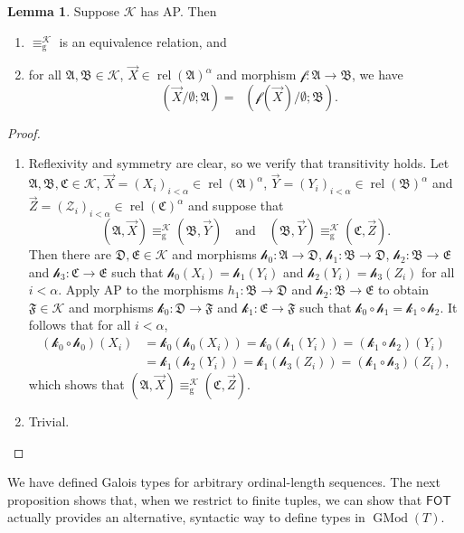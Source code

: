 \documentclass[a4paper]{amsart}
\theoremstyle{definition}
\newtheorem{lemma}[definition]{Lemma}
\theoremstyle{remark}
\newcommand{\Z}{\mathcal{Z}}
\newcommand{\A}{\mathcal{A}}
\newcommand{\B}{\mathcal{B}}
\newcommand{\C}{\mathcal{C}}
\newcommand{\D}{\mathcal{D}}
\newcommand{\E}{\mathcal{E}}
\newcommand{\F}{\mathcal{F}}
\newcommand\fot{\mathsf{FOT}}
\DeclareMathOperator{\rel}{rel}
\newcommand{\K}{\mathcal{K}}
\theoremstyle{definition}
\renewcommand{\A}{\mathfrak{A}}
\renewcommand{\B}{\mathfrak{B}}
\renewcommand{\C}{\mathfrak{C}}
\renewcommand{\D}{\mathfrak{D}}
\renewcommand{\E}{\mathfrak{E}}
\renewcommand{\F}{\mathfrak{F}}
\DeclareMathOperator{\gtype}{tp_g}
\newcommand{\f}{\mathcal{f}}
\newcommand{\h}{\mathcal{h}}
\renewcommand{\k}{\mathcal{k}}
\DeclareMathOperator{\GMod}{GMod}
\begin{document}
\begin{lemma}\label{property.gtypes}
    Suppose $\K$ has AP. Then
    \begin{enumerate}
        \item $\equiv_{\mathrm{g}}^\K$ is an equivalence relation, and
        \item for all $\A,\B\in\K$, $\vec X\in\rel(\A)^\alpha$ and morphism $\f\colon\A\to\B$, we have
        \[
            \gtype(\vec X / \emptyset; \A) = \gtype(\f(\vec X) / \emptyset; \B).
        \]
    \end{enumerate}
\end{lemma}
\begin{proof}\quad
    \begin{enumerate}
        \item Reflexivity and symmetry are clear, so we verify that transitivity holds. Let $\A,\B,\C\in\K$, $\vec X = (X_i)_{i<\alpha}\in\rel(\A)^\alpha$, $\vec Y = (Y_i)_{i<\alpha}\in\rel(\B)^\alpha$ and $\vec Z = (\Z_i)_{i<\alpha}\in\rel(\C)^\alpha$ and suppose that
        \[
            (\A,\vec X) \equiv_{\mathrm{g}}^\K (\B,\vec Y) \quad\text{and}\quad (\B,\vec Y) \equiv_{\mathrm{g}}^\K (\C,\vec Z).
        \]
        Then there are $\D,\E\in\K$ and morphisms $\h_0\colon\A\to\D$, $\h_1\colon\B\to\D$, $\h_2\colon\B\to\E$ and $\h_3\colon\C\to\E$ such that $\h_0(X_i)=\h_1(Y_i)$ and $\h_2(Y_i)=\h_3(Z_i)$ for all $i<\alpha$.  Apply AP to the morphisms $h_1\colon\B\to\D$ and $\h_2\colon\B\to\E$ to obtain $\F\in\K$ and morphisms $\k_0\colon\D\to\F$ and $\k_1\colon\E\to\F$ such that $\k_0\circ\h_1 = \k_1\circ\h_2$. It follows that for all $i<\alpha$,
    	\begin{align*}
            (\k_0\circ\h_0)(X_i) &= \k_0(\h_0(X_i)) = \k_0(\h_1(Y_i)) = (\k_1\circ\h_2)(Y_i) \\
            &= \k_1(\h_2(Y_i)) = \k_1(\h_3(Z_i)) = (\k_1\circ\h_3)(Z_i),
    	\end{align*}
        which shows that $(\A,\vec X)\equiv_{\mathrm{g}}^\K(\C,\vec Z)$.

        \item Trivial.
        \qedhere
    \end{enumerate}
\end{proof}

We have defined Galois types for arbitrary ordinal-length sequences. The next proposition shows that, when we restrict to finite tuples, we can show that $\fot$ actually provides an alternative, syntactic way to define types in $\GMod(T)$.
\end{document}
